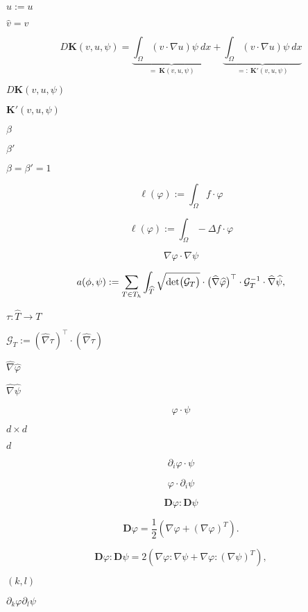 \documentclass{article}
\begin{document}
$\hat{u} := u$
\pagebreak

$\hat{v} = v$
\pagebreak

\[D\mathbf{K}(v,u,\psi) = \underbrace{\int_\Omega (v\cdot\nabla u)\psi~dx}_{=~\mathbf{K}(v,u,\psi)} + \underbrace{\int_\Omega (v\cdot\nabla u)\psi~dx}_{=:~\mathbf{K}'(v,u,\psi)}\]
\pagebreak

$D\mathbf{K}(v,u,\psi)$
\pagebreak

$\mathbf{K'}(v,u,\psi)$
\pagebreak

$\beta$
\pagebreak

$\beta'$
\pagebreak

$\beta = \beta' = 1$
\pagebreak

\[ \ell(\varphi) := \int_\Omega f\cdot\varphi \]
\pagebreak

\[ \ell(\varphi) := \int_\Omega -\Delta f\cdot\varphi \]
\pagebreak

\[ \nabla \varphi \cdot \nabla\psi \]
\pagebreak

\[a(\phi,\psi) := \sum_{T\in T_h} \int_{\widehat{T}}
\sqrt{\textnormal{det}\big(\mathcal{G}_T\big)}
\cdot\big(\widehat{\nabla}\widehat{\varphi}\big)^\top\cdot
\mathcal{G}_T^{-1}
\cdot\widehat{\nabla}\widehat{\psi},\]
\pagebreak

$\tau:\widehat{T}\rightarrow T$
\pagebreak

$\mathcal{G}_T := (\widehat{\nabla} \tau)^\top\cdot (\widehat{\nabla} \tau)$
\pagebreak

$\widehat{\nabla}\widehat{\varphi}$
\pagebreak

$\widehat{\nabla}\widehat{\psi}$
\pagebreak

\[ \varphi \cdot \psi \]
\pagebreak

$ d \times d $
\pagebreak

$ d $
\pagebreak

\[ \partial_i \varphi \cdot \psi \]
\pagebreak

\[ \varphi \cdot \partial_i \psi \]
\pagebreak

\[
  \mathbf{D} \varphi : \mathbf{D} \psi
\]
\pagebreak

\[
  \mathbf{D} \varphi = \frac{1}{2} \left( \nabla \varphi + \left( \nabla \varphi \right)^T \right).
\]
\pagebreak

\[
  \mathbf{D} \varphi : \mathbf{D} \psi = 2 \left( \nabla \varphi : \nabla \psi + \nabla \varphi : \left( \nabla \psi \right)^T \right),
\]
\pagebreak

$ (k,l) $
\pagebreak

$ \partial_k \varphi \partial_l \psi $
\pagebreak
\end{document}
